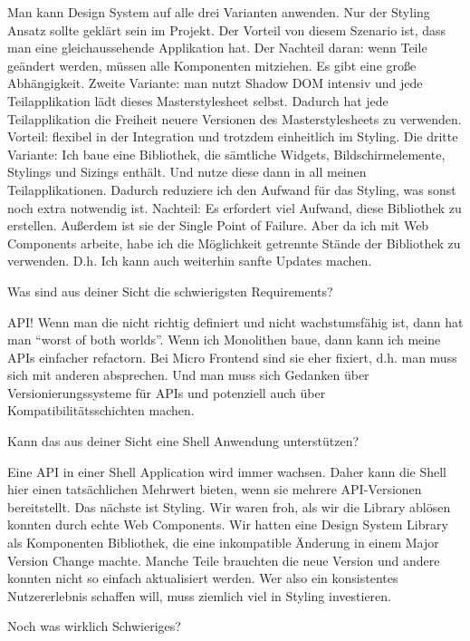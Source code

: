 \begin{description}
    \BerndOlleck Man kann Design System auf alle drei Varianten anwenden. Nur der Styling Ansatz sollte geklärt sein im Projekt. Der Vorteil von diesem Szenario ist, dass man eine gleichaussehende Applikation hat. Der Nachteil daran: wenn Teile geändert werden, müssen alle Komponenten mitziehen. Es gibt eine große Abhängigkeit.
    Zweite Variante: man nutzt Shadow DOM intensiv und jede Teilapplikation lädt dieses Masterstylesheet selbst. Dadurch hat jede Teilapplikation die Freiheit neuere Versionen des Masterstylesheets zu verwenden. Vorteil: flexibel in der Integration und trotzdem einheitlich im Styling.
    Die dritte Variante: Ich baue eine Bibliothek, die sämtliche Widgets, Bildschirmelemente, Stylings und Sizings enthält. Und nutze diese dann in all meinen Teilapplikationen. Dadurch reduziere ich den Aufwand für das Styling, was sonst noch extra notwendig ist. Nachteil: Es erfordert viel Aufwand, diese Bibliothek zu erstellen. Außerdem ist sie der Single Point of Failure. Aber da ich mit Web Components arbeite, habe ich die Möglichkeit getrennte Stände der Bibliothek zu verwenden. D.h. Ich kann auch weiterhin sanfte Updates machen.

    \NicoVogel Was sind aus deiner Sicht die schwierigsten Requirements?

    \BerndOlleck API! Wenn man die nicht richtig definiert und nicht wachstumsfähig ist, dann hat man “worst of both worlds”. Wenn ich Monolithen baue, dann kann ich meine APIs einfacher refactorn.  Bei Micro Frontend sind sie eher fixiert, d.h. man muss sich mit anderen absprechen. Und man muss sich Gedanken über Versionierungssysteme für APIs und potenziell auch über Kompatibilitätsschichten machen.

    \NicoVogel Kann das aus deiner Sicht eine Shell Anwendung unterstützen?

    \BerndOlleck Eine API in einer Shell Application wird immer wachsen. Daher kann die Shell hier einen tatsächlichen Mehrwert bieten, wenn sie mehrere API-Versionen bereitstellt.
    Das nächste ist Styling. Wir waren froh, als wir die Library ablösen konnten durch echte Web Components. Wir hatten eine Design System Library als Komponenten Bibliothek, die eine inkompatible Änderung in einem Major Version Change machte. Manche Teile brauchten die neue Version und andere konnten nicht so einfach aktualisiert werden. Wer also ein konsistentes Nutzererlebnis schaffen will, muss ziemlich viel in Styling investieren.

    \NicoVogel Noch was wirklich Schwieriges?


\end{description}
